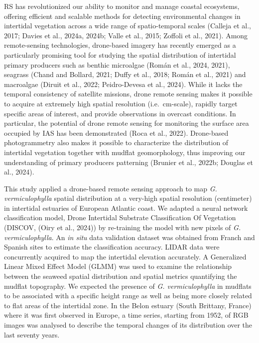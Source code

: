 \documentclass[
  letterpaper,
  11pt,
  english,
  singlespacing,
  headsepline]{MastersDoctoralThesis}
\begin{document}
\begin{spacing}{1.5}
RS has revolutionized our ability to monitor and manage coastal
ecosystems, offering efficient and scalable methods for detecting
environmental changes in intertidal vegetation across a wide range of
spatio-temporal scales (Calleja et al., 2017; Davies et al., 2024a,
2024b; Valle et al., 2015; Zoffoli et al., 2021). Among remote-sensing
technologies, drone-based imagery has recently emerged as a particularly
promising tool for studying the spatial distribution of intertidal
primary producers such as benthic microalgae (Román et al., 2024, 2021),
seagrass (Chand and Bollard, 2021; Duffy et al., 2018; Román et al.,
2021) and macroalgae (Diruit et al., 2022; Peidro-Devesa et al., 2024).
While it lacks the temporal consistency of satellite missions, drone
remote sensing makes it possible to acquire at extremely high spatial
resolution (i.e.~cm-scale), rapidly target specific areas of interest,
and provide observations in overcast conditions. In particular, the
potential of drone remote sensing for monitoring the surface area
occupied by IAS has been demonstrated (Roca et al., 2022). Drone-based
photogrammetry also makes it possible to characterize the distribution
of intertidal vegetation together with mudflat geomorphology, thus
improving our understanding of primary producers patterning (Brunier et
al., 2022b; Douglas et al., 2024).

This study applied a drone-based remote sensing approach to map \emph{G.
vermiculophylla} spatial distribution at a very-high spatial resolution
(centimeter) in intertidal estuaries of European Atlantic coast. We
adapted a neural network classification model, Drone Intertidal
Substrate Classification Of Vegetation (DISCOV, (Oiry et al., 2024)) by
re-training the model with new pixels of \emph{G. vermiculophylla}. An
\emph{in situ} data validation dataset was obtained from Franch and
Spanish sites to estimate the classification accuracy. LIDAR data were
concurrently acquired to map the intertidal elevation accurately. A
Generalized Linear Mixed Effect Model (GLMM) was used to examine the
relationship between the seaweed spatial distribution and spatial
metrics quantifying the mudflat topography. We expected the presence of
\emph{G. vermiculophylla} in mudflats to be associated with a specific
height range as well as being more closely related to flat areas of the
intertidal zone. In the Belon estuary (South Brittany, France) where it
was first observed in Europe, a time series, starting from 1952, of RGB
images was analysed to describe the temporal changes of its distribution
over the last seventy years.


\end{spacing}
\end{document}

